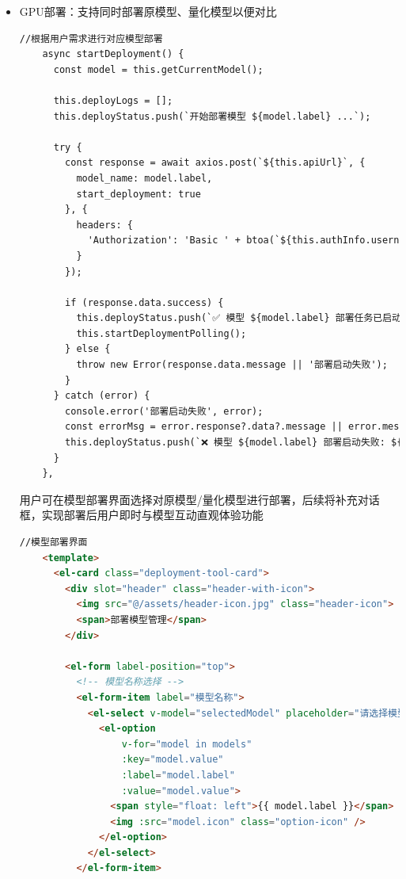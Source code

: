 \documentclass[AutoFakeBold,AutoFakeSlant,language=chinese,degree=bachelor]{sustechthesis}
\begin{document}
\begin{itemize}
\begin{lstlisting}[language=python]
            with open(EVALUATION_LOG, 'a') as f:
                f.write("[INFO] 评估进程已被用户取消\n")
            
            current_eval_process = None
            
            return jsonify({
                'success': True,
                'message': '评估进程已成功取消'
            })
        except Exception as e:
            error_msg = f"取消评估失败: {str(e)}"
            log_error(error_msg, "backend")
            return jsonify({
                'success': False,
                'message': error_msg
            }), 500
    \end{lstlisting}
    
    \item GPU部署：支持同时部署原模型、量化模型以便对比
    \begin{lstlisting}[language=HTML]
    //根据用户需求进行对应模型部署
    async startDeployment() {
      const model = this.getCurrentModel();

      this.deployLogs = [];
      this.deployStatus.push(`开始部署模型 ${model.label} ...`);

      try {
        const response = await axios.post(`${this.apiUrl}`, {
          model_name: model.label,
          start_deployment: true
        }, {
          headers: {
            'Authorization': 'Basic ' + btoa(`${this.authInfo.username}:${this.authInfo.password}`)
          }
        });

        if (response.data.success) {
          this.deployStatus.push(`✅ 模型 ${model.label} 部署任务已启动`);
          this.startDeploymentPolling();
        } else {
          throw new Error(response.data.message || '部署启动失败');
        }
      } catch (error) {
        console.error('部署启动失败', error);
        const errorMsg = error.response?.data?.message || error.message;
        this.deployStatus.push(`❌ 模型 ${model.label} 部署启动失败: ${errorMsg}`);
      }
    },
    \end{lstlisting}
    用户可在模型部署界面选择对原模型/量化模型进行部署，后续将补充对话框，实现部署后用户即时与模型互动直观体验功能
    \begin{lstlisting}[language=HTML]
    //模型部署界面
    <template>
      <el-card class="deployment-tool-card">
        <div slot="header" class="header-with-icon">
          <img src="@/assets/header-icon.jpg" class="header-icon">
          <span>部署模型管理</span>
        </div>
    
        <el-form label-position="top">
          <!-- 模型名称选择 -->
          <el-form-item label="模型名称">
            <el-select v-model="selectedModel" placeholder="请选择模型">
              <el-option
                  v-for="model in models"
                  :key="model.value"
                  :label="model.label"
                  :value="model.value">
                <span style="float: left">{{ model.label }}</span>
                <img :src="model.icon" class="option-icon" />
              </el-option>
            </el-select>
          </el-form-item>
    

\end{lstlisting}
\end{itemize}
\end{document}
